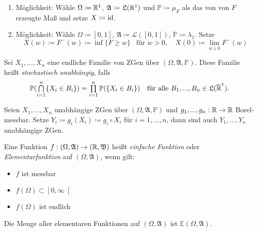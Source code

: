 \documentclass{cheat-sheet}
\newcommand{\Alg}{\mathfrak{A}} %
\newcommand{\LebAlg}{\mathfrak{L}} %
\renewcommand{\P}{\mathbb{P}}
\newcommand{\E}{\mathbb{E}} %
\newcommand{\ER}{\overline\R} %
\newcommand{\Bor}{\mathfrak{B}} %
\newcommand{\Leb}{\mathcal{L}} %
\begin{document}
\begin{beweis}
  \begin{enumerate}
    \item Möglichkeit: Wähle $\Omega \coloneqq \mathbb{R}^1$, $\Alg \coloneqq \LebAlg(\R^1)$ und $\P \coloneqq \mu_F$ als das von von $F$ erzeugte Maß und setze $X \coloneqq \mathrm{id}$.
    \item Möglichkeit: Wähle $\Omega \coloneqq [0,1]$, $\Alg \coloneqq \Leb([0,1])$, $\P \coloneqq \lambda_1$. Setze
    \[
      X(w) \coloneqq F^{-}(w) \coloneqq \inf \{ F \geq w \} \enspace \text{ für } w > 0, \quad
      X(0) \coloneqq \lim_{w \downarrow 0} F^{-}(w)
    \]
  \end{enumerate}
\end{beweis}




\begin{defn}
  Sei $X_1, ..., X_n$ eine endliche Familie von ZGen über $(\Omega, \Alg, \P)$. Diese Familie heißt \emph{stochastisch unabhängig}, falls
  \[ \P(\bigcap_{i=1}^n \{ X_i \in B_i \}) = \prod_{i=1}^n \P(\{ X_i \in B_i \}) \quad \text{für alle $B_1, ..., B_n \in \LebAlg(\ER^1)$.} \]
\end{defn}

\begin{satz}
  Seien $X_1, ..., X_n$ unabhängige ZGen über $(\Omega, \Alg, \P)$ und $g_1, ..., g_n : \mathbb{R} \to \mathbb{R}$ Borel-messbar. Setze $Y_i \coloneqq g_i(X_i) \coloneqq g_i \circ X_i$ für $i = 1, ..., n$, dann sind auch $Y_1, ..., Y_n$ unabhängige ZGen.
\end{satz}


\begin{defn}
  Eine Funktion $f : (\Omega, \Alg) \to (\R, \Bor)$ heißt \emph{einfache Funktion} oder \emph{Elementarfunktion} auf $(\Omega, \Alg)$, wenn gilt:
  \begin{multicols}{3}
    \begin{itemize}
      \item $f$ ist messbar
      \item $f(\Omega) \subset \left[0, \infty\right[$
      \item $f(\Omega)$ ist endlich
    \end{itemize}
  \end{multicols}
  Die Menge aller elementaren Funktionen auf $(\Omega, \Alg)$ ist $\E(\Omega, \Alg)$.
\end{defn}
\end{document}
